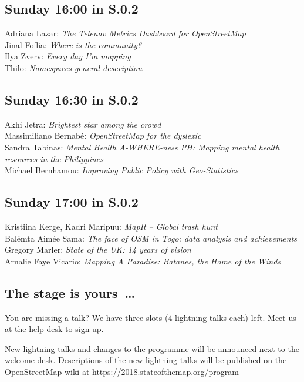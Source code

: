 \subsection*{Sunday 16:00 in S.0.2}
Adriana Lazar: \emph{The Telenav Metrics Dashboard for OpenStreetMap}\\
Jinal Foflia: \emph{Where is the community?}\\
Ilya Zverv: \emph{Every day I'm mapping}\\
Thilo: \emph{Namespaces general description}

\subsection*{Sunday 16:30 in S.0.2}
Akhi Jetra: \emph{Brightest star among the crowd}\\
Massimiliano Bernabé: \emph{OpenStreetMap for the dyslexic}\\
Sandra Tabinas: \emph{Mental Health A-WHERE-ness PH: Mapping mental health resources in the Philippines}\\
Michael Bernhamou: \emph{Improving Public Policy with Geo-Statistics}

\subsection*{Sunday 17:00 in S.0.2}
Kristiina Kerge, Kadri Maripuu: \emph{MapIt -- Global trash hunt}\\
Balémta Aimée Sama: \emph{The face of OSM in Togo: data analysis and achievements}\\
Gregory Marler: \emph{State of the UK: 14 years of vision}\\
Arnalie Faye Vicario: \emph{Mapping A Paradise: Batanes, the Home of the Winds}

\subsection*{The stage is yours~\dots}

You are missing a talk? We have three slots (4 lightning talks each) left. Meet us at the help desk to
sign up.

New lightning talks and changes to the programme will be announced next to the welcome desk. Descriptions of the new lightning talks will be published on the OpenStreetMap wiki at \mbox{https://2018.stateofthemap.org/program}
